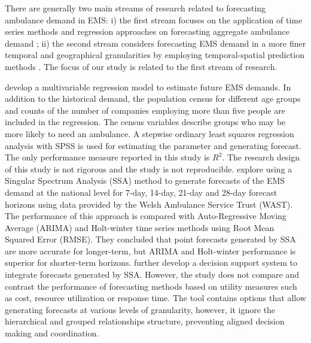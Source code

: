 \documentclass[
  authoryear,
  preprint,
  3p]{elsarticle}
\begin{document}
There are generally two main streams of research related to forecasting
ambulance demand in EMS: i) the first stream focuses on the application
of time series methods and regression approaches on forecasting
aggregate ambulance demand \citep{vile2012predicting, sasaki2010using};
ii) the second stream considers forecasting EMS demand in a more finer
temporal and geographical granularities by employing temporal-spatial
prediction methods \citep{zhou2016predicting, zhou2016predictinglit}.
The focus of our study is related to the first stream of research.

\citet{sasaki2010using} develop a multivariable regression model to
estimate future EMS demands. In addition to the historical demand, the
population census for different age groups and counts of the number of
companies employing more than five people are included in the
regression. The census variables describe groups who may be more likely
to need an ambulance. A stepwise ordinary least squares regression
analysis with SPSS is used for estimating the parameter and generating
forecast. The only performance measure reported in this study is
\(R^2\). The research design of this study is not rigorous and the study
is not reproducible. \citet{vile2012predicting} explore using a Singular
Spectrum Analysis (SSA) method to generate forecasts of the EMS demand
at the national level for 7-day, 14-day, 21-day and 28-day forecast
horizons using data provided by the Welsh Ambulance Service Trust
(WAST). The performance of this approach is compared with
Auto-Regressive Moving Average (ARIMA) and Holt-winter time series
methods using Root Mean Squared Error (RMSE). They concluded that point
forecasts generated by SSA are more accurate for longer-term, but ARIMA
and Holt-winter performance is superior for shorter-term horizons.
\citet{vile2016time} further develop a decision support system to
integrate forecasts generated by SSA. However, the study does not
compare and contrast the performance of forecasting methods based on
utility measures such as cost, resource utilization or response time.
The tool contains options that allow generating forecasts at various
levels of granularity, however, it ignore the hierarchical and grouped
relationships structure, preventing aligned decision making and
coordination.
\end{document}
